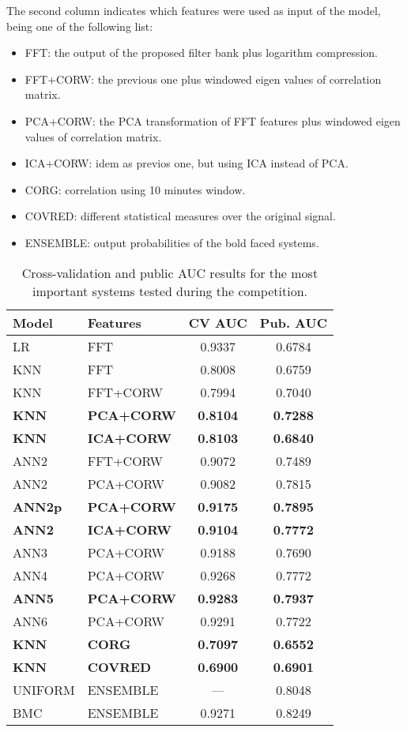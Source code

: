 \documentclass[a4paper,english,twoside]{article}
\begin{document}
The second column indicates which features were used as input of the
model, being one of the following list:

\begin{itemize}
\item
  FFT: the output of the proposed filter bank plus logarithm
  compression.
\item
  FFT+CORW: the previous one plus windowed eigen values of correlation
  matrix.
\item
  PCA+CORW: the PCA transformation of FFT features plus windowed eigen
  values of correlation matrix.
\item
  ICA+CORW: idem as previos one, but using ICA instead of PCA.
\item
  CORG: correlation using 10 minutes window.
\item
  COVRED: different statistical measures over the original signal.
\item
  ENSEMBLE: output probabilities of the bold faced systems.
\end{itemize}

\begin{table}
  \centering
  \begin{tabular}{|l|l|cc|}
    \hline
    Model & Features & CV AUC & Pub. AUC\\
    \hline
    \hline
    LR & FFT & 0.9337 & 0.6784\\
    \hline
    KNN & FFT & 0.8008 & 0.6759\\
    KNN & FFT+CORW & 0.7994 & 0.7040\\
    \textbf{KNN} & \textbf{PCA+CORW} & \textbf{0.8104} & \textbf{0.7288}\\
    \textbf{KNN} & \textbf{ICA+CORW} & \textbf{0.8103} & \textbf{0.6840}\\
    \hline
    ANN2 & FFT+CORW & 0.9072 & 0.7489\\
    ANN2 & PCA+CORW & 0.9082 & 0.7815\\
    \textbf{ANN2p} & \textbf{PCA+CORW} & \textbf{0.9175} & \textbf{0.7895}\\
    \textbf{ANN2} & \textbf{ICA+CORW} & \textbf{0.9104} & \textbf{0.7772}\\
    ANN3 & PCA+CORW & 0.9188 & 0.7690\\
    ANN4 & PCA+CORW & 0.9268 & 0.7772\\
    \textbf{ANN5} & \textbf{PCA+CORW} & \textbf{0.9283} & \textbf{0.7937}\\
    ANN6 & PCA+CORW & 0.9291 & 0.7722\\
    \hline
    \textbf{KNN} & \textbf{CORG} & \textbf{0.7097} & \textbf{0.6552}\\
    \textbf{KNN} & \textbf{COVRED} & \textbf{0.6900} & \textbf{0.6901}\\
    \hline
    UNIFORM & ENSEMBLE & --- & 0.8048\\
    BMC & ENSEMBLE & 0.9271 & 0.8249\\
    \hline
  \end{tabular}
  \caption{Cross-validation and public AUC results for the most important
    systems tested during the competition.\label{tab:val}}
\end{table}            
\end{document}
